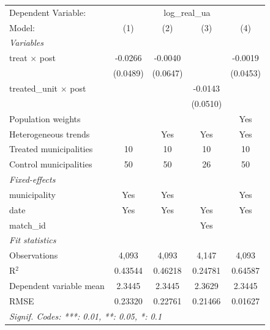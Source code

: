 
\begingroup
\centering
\begin{tabular}{lcccc}
   \tabularnewline \midrule \midrule
   Dependent Variable: & \multicolumn{4}{c}{log\_real\_ua}\\
   Model:                        & (1)      & (2)      & (3)      & (4)\\  
   \midrule
   \emph{Variables}\\
   treat $\times$ post           & -0.0266  & -0.0040  &          & -0.0019\\   
                                 & (0.0489) & (0.0647) &          & (0.0453)\\   
   treated\_unit $\times$ post   &          &          & -0.0143  &   \\   
                                 &          &          & (0.0510) &   \\   
   Population weights            &          &          &          & Yes\\  
   Heterogeneous trends          &          & Yes      & Yes      & Yes\\  
   Treated municipalities        & 10       & 10       & 10       & 10\\  
   Control municipalities        & 50       & 50       & 26       & 50\\  
   \midrule
   \emph{Fixed-effects}\\
   municipality                  & Yes      & Yes      &          & Yes\\  
   date                          & Yes      & Yes      & Yes      & Yes\\  
   match\_id                     &          &          & Yes      & \\  
   \midrule
   \emph{Fit statistics}\\
   Observations                  & 4,093    & 4,093    & 4,147    & 4,093\\  
   R$^2$                         & 0.43544  & 0.46218  & 0.24781  & 0.64587\\  
   Dependent variable mean       & 2.3445   & 2.3445   & 2.3629   & 2.3445\\  
   RMSE                          & 0.23320  & 0.22761  & 0.21466  & 0.01627\\  
   \midrule \midrule
   \multicolumn{5}{l}{\emph{Signif. Codes: ***: 0.01, **: 0.05, *: 0.1}}\\
\end{tabular}
\par\endgroup


